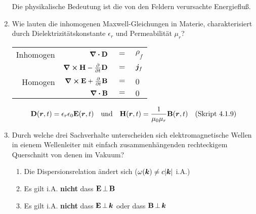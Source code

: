 \begin{enumerate}
        \begin{center}
          Die physikalische Bedeutung ist die von den 
          Feldern verursachte Energiefluß.
        \end{center}

  \clearpage
  \item Wie lauten die inhomogenen Maxwell-Gleichungen in Materie,
        charakterisiert durch Dielektrizitätskonstante $\epsilon_r$ und
        Permeabilität $\mu_r$?
        \begin{center}
          \begin{tabular}{rrcl}
            Inhomogen&$\div \vb D$ & $=$ &$\rho_f$\\
            &$\curl \vb H-\pdv{t}\vb D$ & $=$ &$\vb* j_f$\\
            Homogen&$\curl \vb E+\pdv{t}\vb B$ & $=$ &$0$\\
            &$\div \vb B$ & $=$ &$0$\\
          \end{tabular}
          $$\vb D(\vb* r,t)=\epsilon_r\epsilon_0\vb E(\vb* r,t) \quad
          \text{und}\quad\vb H(\vb* r, t)=\frac{1}{\mu_0\mu_r}
          \vb B(\vb* r,t)\quad\text{(Skript 4.1.9)}$$
        \end{center}

  \item Durch welche drei Sachverhalte unterscheiden sich 
        elektromagnetische Wellen in eienem Wellenleiter mit einfach
        zusammenhängenden rechteckigem Querschnitt von denen im Vakuum?
        \begin{enumerate}
          \item Die Dispersionsrelation ändert sich 
                ($\omega(\vb* k)\ne c\abs{\vb* k}$ i.A.)
          \item Es gilt i.A. \textbf{nicht} dass $\vb E\,\bot\,\vb B$
          \item Es gilt i.A. \textbf{nicht} dass $\vb E\,\bot\,\vb* k$
                oder dass $\vb B\,\bot\,\vb* k$
        \end{enumerate}
        \begin{center}
        \end{center}


\end{enumerate}
